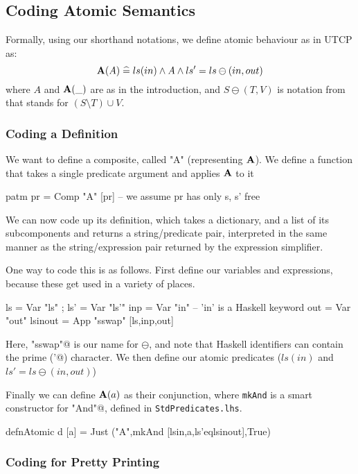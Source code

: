 \subsection{Coding Atomic Semantics}

Formally, using our shorthand notations, 
we define atomic behaviour as in UTCP as:
\[
    \mathbf{A}(A) \mathrel{\widehat=} ls(in) \land A \land ls'=ls\ominus(in,out)
\]
where $A$ and $\mathbf{A}(\_)$ are as in the introduction,
and $S\ominus(T,V)$ is notation from \cite{DBLP:conf/icfem/WoodcockH02}
that stands for $(S\setminus T)\cup V$.


\subsubsection{Coding a Definition}

We want to define a composite, called "A" (representing $\mathbf{A}$).
We  define a function that takes a single predicate argument
and applies $\mathbf{A}$ to it
\begin{code}
patm pr = Comp "A" [pr] -- we assume pr has only s, s' free
\end{code}
We can now code up its definition,
which takes a dictionary, and a list of its subcomponents
and returns a string/predicate pair,
interpreted in the same manner as the string/expression pair
returned by the expression simplifier.

One way to code this is as follows.
First define our variables and expressions,
because these get used in a variety of places.
\begin{code}
ls = Var "ls" ; ls' = Var "ls'"
inp = Var "in" -- 'in' is a Haskell keyword
out = Var "out"
lsinout = App "sswap" [ls,inp,out]
\end{code}
Here, \verb@"sswap"@ is our name for $\ominus$,
and note that Haskell identifiers can contain
the prime (\verb@'@) character.
We then define our atomic predicates ($ls(in)$ and $ls'=ls\ominus(in,out)$)
Finally we can define $\mathbf{A}(a)$ as their conjunction,
where \texttt{mkAnd} is a smart constructor for \verb@Comp "And"@,
defined in \texttt{StdPredicates.lhs}.
\begin{code}
defnAtomic d [a] = Just ("A",mkAnd [lsin,a,ls'eqlsinout],True)
\end{code}

\subsubsection{Coding for Pretty Printing}

